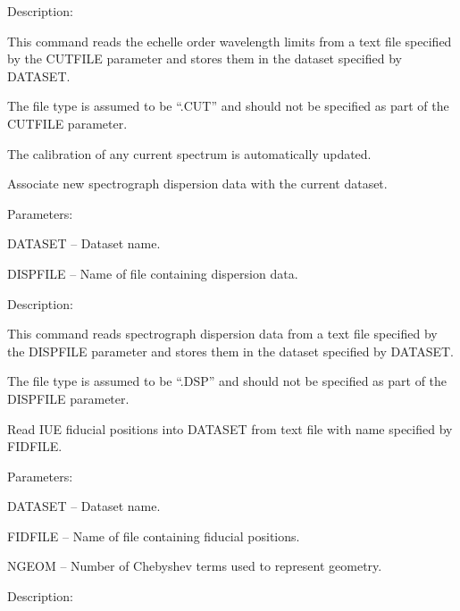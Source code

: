 \begin {description}
\begin {description}
\item Description:

This command reads the echelle order wavelength limits from a text file
specified by the CUTFILE parameter and stores them in the dataset
specified by DATASET.

The file type is assumed to be ``.CUT'' and should not be
specified as part of the CUTFILE parameter.

The calibration of any current spectrum is automatically updated.
\end {description}

\item [NEWDISP]
Associate new spectrograph dispersion data with the current dataset.

\begin {description}
\item Parameters:

\begin {description}
\item DATASET -- Dataset name.
\item DISPFILE -- Name of file containing dispersion data.
\end {description}

\item Description:

This command reads spectrograph dispersion data from a text file
specified by the DISPFILE parameter and stores them in the dataset
specified by DATASET.

The file type is assumed to be ``.DSP'' and should not be specified
as part of the DISPFILE parameter.
\end {description}

\item [NEWFID]
Read IUE fiducial positions into DATASET from text file with
name specified by FIDFILE.

\begin {description}
\item Parameters:

\begin {description}
\item DATASET -- Dataset name.
\item FIDFILE -- Name of file containing fiducial positions.
\item NGEOM -- Number of Chebyshev terms used to represent geometry.
\end {description}

\item Description:


\end{description}
\end{description}

